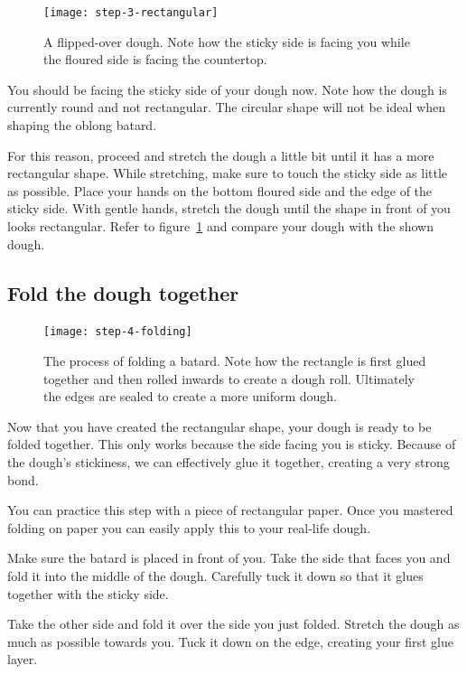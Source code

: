\begin{figure}[htb!]
  \texttt{[image: step-3-rectangular]}
  \caption{A flipped-over dough. Note how the sticky side is facing
  you while the floured side is facing the countertop.}%
  \label{fig:shaping-rectangular-dough}
\end{figure}

You should be facing the sticky side of your dough now. Note how
the dough is currently round and not rectangular. The circular
shape will not be ideal when shaping the oblong batard.

For this reason, proceed and stretch the dough a little bit until
it has a more rectangular shape. While stretching, make sure to touch
the sticky side as little as possible. Place your hands on the bottom
floured side and the edge of the sticky side. With gentle hands,
stretch the dough until the shape in front of you looks rectangular.
Refer to figure~\ref{fig:shaping-rectangular-dough} and compare
your dough with the shown dough.

\subsection[Folding]{Fold the dough together}

\begin{figure}[htb!]
  \texttt{[image: step-4-folding]}
  \caption{The process of folding a batard. Note how the rectangle is first glued
  together and then rolled inwards to create a dough roll. Ultimately the edges
  are sealed to create a more uniform dough.}%
  \label{fig:shaping-folding}
\end{figure}

Now that you have created the rectangular shape, your dough
is ready to be folded together. This only works because the side
facing you is sticky. Because of the dough's stickiness,
we can effectively glue it together, creating a very
strong bond.

You can practice this step with a piece of rectangular paper.
Once you mastered folding on paper you can easily apply
this to your real-life dough.

Make sure the batard is placed in front of you. Take the side
that faces you and fold it into the middle of the dough. Carefully
tuck it down so that it glues together with the sticky side.

Take the other side and fold it over the side you just folded.
Stretch the dough as much as possible towards you. Tuck it down
on the edge, creating your first glue layer.

